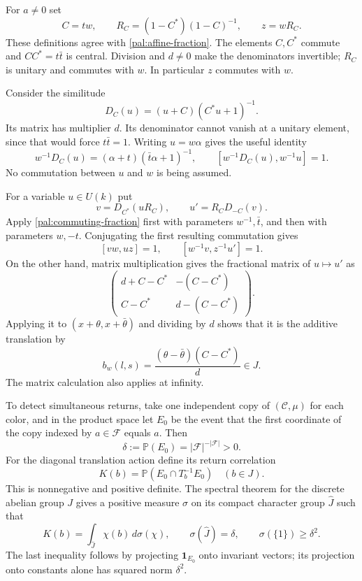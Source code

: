 For $a\ne0$ set
\[
 C=tw,\qquad R_C=(1-C^*)(1-C)^{-1},\qquad z=wR_C.
\]
These definitions agree with \eqref{pal:affine-fraction}.
The elements $C,C^*$ commute and $CC^*=t\bar t$ is central.
Division and $d\ne0$ make the denominators invertible; $R_C$ is
unitary and commutes with $w$.  In particular $z$ commutes with $w$.

Consider the similitude
\[
 D_C(u)=(u+C)(C^*u+1)^{-1}.
\]
Its matrix has multiplier $d$.  Its denominator cannot vanish at a
unitary element, since that would force $t\bar t=1$.
Writing $u=w\alpha$ gives the useful identity
\begin{equation}\label{pal:commuting-fraction}
 w^{-1}D_C(u)=(\alpha+t)(\bar t\alpha+1)^{-1},\qquad
 [w^{-1}D_C(u),w^{-1}u]=1.
\end{equation}
No commutation between $u$ and $w$ is being assumed.

For a variable $u\in U(k)$ put
\[
 v=D_{C^*}(uR_C),\qquad u'=R_C D_{-C}(v).
\]
Apply \eqref{pal:commuting-fraction} first with parameters
$w^{-1},\bar t$, and then with parameters $w,-t$.  Conjugating the
first resulting commutation gives
\begin{equation}\label{pal:two-commutations}
 [vw,uz]=1,\qquad [w^{-1}v,z^{-1}u']=1.
\end{equation}
On the other hand, matrix multiplication gives the fractional matrix
of $u\mapsto u'$ as
\[
 \begin{pmatrix}
 d+C-C^*&-(C-C^*)\\ C-C^*&d-(C-C^*)
 \end{pmatrix}.
\]
Applying it to $(x+\theta,x+\bar\theta)$ and dividing by $d$ shows
that it is the additive translation by
\begin{equation}\label{pal:translation-vector}
 b_w(l,s)=\frac{(\theta-\bar\theta)(C-C^*)}{d}\in J.
\end{equation}
The matrix calculation also applies at infinity.

To detect simultaneous returns, take one independent copy of
$(\mathcal C,\mu)$ for each color, and in the product space let $E_0$
be the event that the first coordinate of the copy indexed by
$a\in\mathcal F$ equals $a$.  Then
\[
 \delta:=\mathbb P(E_0)=|\mathcal F|^{-|\mathcal F|}>0.
\]
For the diagonal translation action define its return correlation
\begin{equation}\label{pal:correlation}
 K(b)=\mathbb P(E_0\cap T_b^{-1}E_0)\quad(b\in J).
\end{equation}
This is nonnegative and positive definite.  The spectral theorem for
the discrete abelian group $J$ gives a positive measure $\sigma$ on
its compact character group $\widehat J$ such that
\begin{equation}\label{pal:spectral-measure}
 K(b)=\int_{\widehat J}\chi(b)\,d\sigma(\chi),\qquad
 \sigma(\widehat J)=\delta,\qquad \sigma(\{1\})\geq\delta^2.
\end{equation}
The last inequality follows by projecting $\mathbf1_{E_0}$ onto
invariant vectors; its projection onto constants alone has squared
norm $\delta^2$.

